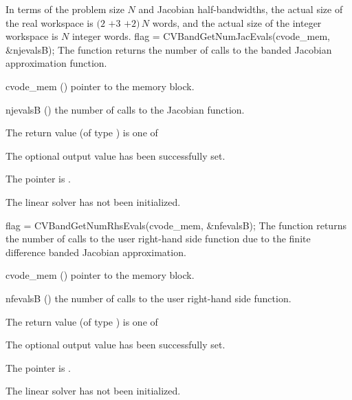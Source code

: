 {
  In terms of the problem size $N$ and Jacobian half-bandwidths, 
  the actual size of the real workspace is
  $(2$ $+ 3$  $+ 2)\, N$  words,
  and the actual size of the integer workspace is $N$ integer words.
}
{
  flag = CVBandGetNumJacEvals(cvode\_mem, \&njevalsB);
}
{
  The function  returns the
  number of calls to the banded Jacobian approximation function.
}
{
  \begin{args}
  \item[cvode\_mem] ()
    pointer to the {\cvode} memory block.
  \item[njevalsB] ()
    the number of calls to the Jacobian function.
  \end{args}
}
{
  The return value  (of type ) is one of
  \begin{args}
  \item[\Id{CVBAND\_SUCCESS}] 
    The optional output value has been successfully set.
  \item[\Id{CVBAND\_MEM\_NULL}]
    The  pointer is .
  \item[\Id{CVBAND\_LMEM\_NULL}]
    The {\cvband} linear solver has not been initialized.
  \end{args}
}
{}
{
  flag = CVBandGetNumRhsEvals(cvode\_mem, \&nfevalsB);
}
{
  The function  returns the
  number of calls to the user right-hand side function due to the 
  finite difference banded Jacobian approximation.
}
{
  \begin{args}
  \item[cvode\_mem] ()
    pointer to the {\cvode} memory block.
  \item[nfevalsB] ()
    the number of calls to the user right-hand side function.
  \end{args}
}
{
  The return value  (of type ) is one of
  \begin{args}
  \item[\Id{CVBAND\_SUCCESS}] 
    The optional output value has been successfully set.
  \item[\Id{CVBAND\_MEM\_NULL}]
    The  pointer is .
  \item[\Id{CVBAND\_LMEM\_NULL}]
    The {\cvband} linear solver has not been initialized.
  \end{args}
}
